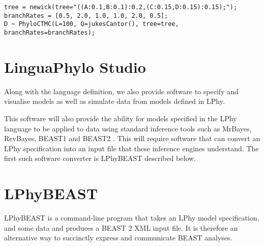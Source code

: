 \documentclass[oneside]{article}
\begin{document}
\begin{verbatim}
tree = newick(tree="((A:0.1,B:0.1):0.2,(C:0.15,D:0.15):0.15);");
branchRates = [0.5, 2.0, 1.0, 1.0, 2.0, 0.5];
D ~ PhyloCTMC(L=100, Q=jukesCantor(), tree=tree, branchRates=branchRates);
\end{verbatim}

\section{LinguaPhylo Studio}

Along with the language definition, we also provide software to
specify and visualise models as well as simulate data from models
defined in LPhy.

This software will also provide the ability for models specified in
the LPhy language to be applied to data using standard inference tools
such as MrBayes, RevBayes, BEAST1 and BEAST2
\cite{bouckaert2014beastanalysis,DrummondBouckaert2015,bouckaert2019beastanalysis}.
This will require software that can convert an LPhy specification into
an input file that these inference engines understand.
The first such software converter is LPhyBEAST described below.

\section{LPhyBEAST}

LPhyBEAST is a command-line program that takes an LPhy model
specification, and some data and produces a BEAST 2 XML input file.
It is therefore an alternative way to succinctly express and
communicate BEAST analyses. 

%

\end{document}
